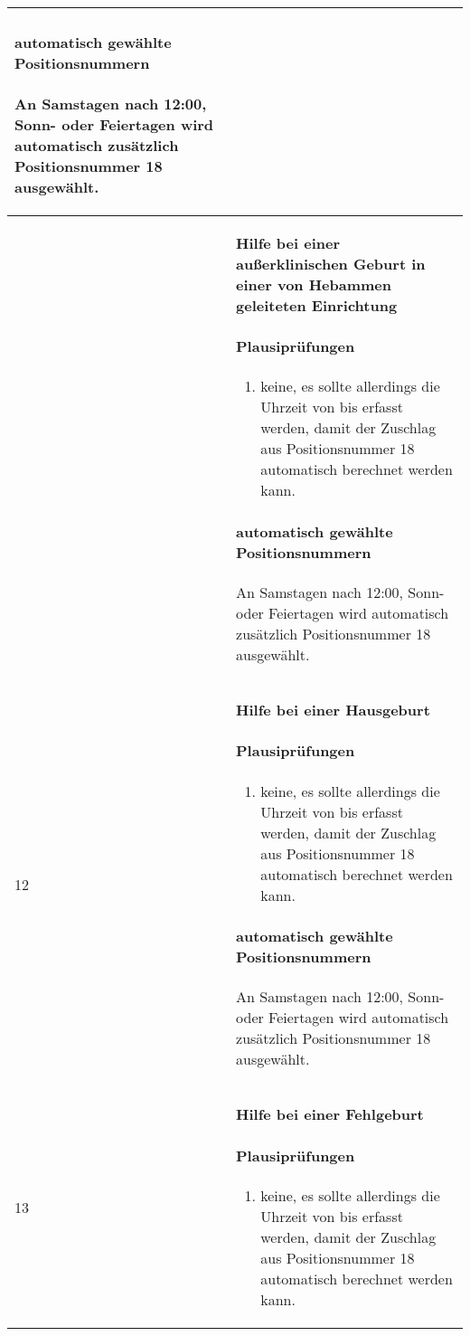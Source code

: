\begin{mpsupertabular}{|>{\centering}p{1.9cm}|p{11.6cm}|}
\paragraph{automatisch gewählte Positionsnummern}
An Samstagen nach 12:00, Sonn- oder Feiertagen wird automatisch 
zusätzlich Positionsnummer 18 ausgewählt.
\\ \hline


11&
\textbf{Hilfe bei einer außerklinischen Geburt in einer von Hebammen
geleiteten Einrichtung}
\paragraph{Plausiprüfungen}
\begin{enumerate}
\item
keine, es sollte allerdings die Uhrzeit von bis erfasst werden, damit
der Zuschlag aus Positionsnummer 18 automatisch berechnet werden
kann.
\end{enumerate}
\paragraph{automatisch gewählte Positionsnummern}
An Samstagen nach 12:00, Sonn- oder Feiertagen wird automatisch 
zusätzlich Positionsnummer 18 ausgewählt.
\\ \hline


12&
\textbf{Hilfe bei einer Hausgeburt}
\paragraph{Plausiprüfungen}
\begin{enumerate}
\item
keine, es sollte allerdings die Uhrzeit von bis erfasst werden, damit
der Zuschlag aus Positionsnummer 18 automatisch berechnet werden
kann.
\end{enumerate}
\paragraph{automatisch gewählte Positionsnummern}
An Samstagen nach 12:00, Sonn- oder Feiertagen wird automatisch 
zusätzlich Positionsnummer 18 ausgewählt.
\\ \hline


13&
\textbf{Hilfe bei einer Fehlgeburt}
\paragraph{Plausiprüfungen}
\begin{enumerate}
\item
keine, es sollte allerdings die Uhrzeit von bis erfasst werden, damit
der Zuschlag aus Positionsnummer 18 automatisch berechnet werden
kann.
\end{enumerate}

\end{mpsupertabular}
